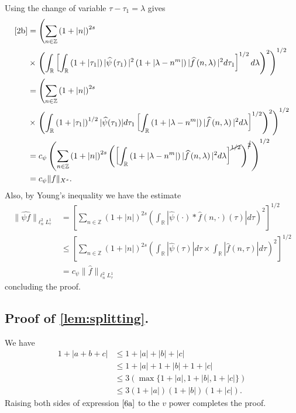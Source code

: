 \documentclass[12pt,reqno]{amsart}
\numberwithin{equation}{section}  %
\numberwithin{figure}{section}
\newcommand{\rr}{\mathbb{R}}
\newcommand{\zz}{\mathbb{Z}}
\newcommand{\wh}{\widehat}
\theoremstyle{plain}
\theoremstyle{definition}
\theoremstyle{remark}
\begin{document}
%
%
Using the change of variable $\tau - \tau_1 = \lambda$ gives
%
%
\begin{equation*}
	\begin{split}
		\eqref{2b}
		& = \left( \sum_{n \in \zz} \left (1 + |n| \right )^{2s}\right.
		\\
		& \times \left.  \left( \int_\rr \left[
		\int_\rr \left( 1 + | \tau_1 | \right) | \wh{\psi}\left( \tau_1
		\right) |^2 \left( 1 + | \lambda - n^{m} | \right) | \wh{f} \left( n,
		\lambda
		\right)|^2 d \tau_1 \right]^{1/2} d \lambda \right)^2 \right)^{1/2}
		\\
		& =  \left( \sum_{n \in \zz} \left (1 + |n| \right )^{2s} \right.
		\\
		& \times \left. \left( \int_\rr \left( 1 + |
		\tau_1 |
		\right)^{1/2} | \wh{\psi}(\tau_1) | d \tau_1 \left[ \int_\rr \left( 1 + |
		\lambda - n^{m} |
		\right) | \wh{f}\left( n, \lambda \right) |^2 d \lambda \right]^{1/2}
		\right)^2 \right)^{1/2}
		\\
		& = c_{\psi} \left( \sum_{n \in \zz} \left (1 + |n| \right )^{2s} \left( \left[ \int_\rr
		\left( 1 + | \lambda - n^{m} | \right) | \wh{f}\left( n, \lambda
		\right) |^2 d \lambda
		\right]^{\cancel{1/2}} \right)^{\cancel{2}} \right)^{1/2}
		\\
		& = c_{\psi} \|f\|_{X^s}.
	\end{split}
\end{equation*}
%
Also, by Young's inequality we have the estimate 
%
%
\begin{equation*}
\begin{split}
  \|\wh{\psi f}\|_{\ell^{2}_{n} L^{1}_{\tau}} 
  & = \left[ \sum_{n \in \zz} \left (1 + |n| \right )^{2s} \left (
  \int_{\rr} | \wh{\psi}(\cdot) * \wh{f}(n, \cdot)(\tau) | d \tau  \right ) ^2 \right]^{1/2}
  \\
  & \le  \left[ \sum_{n \in \zz} (1 + | n |)^{2s} \left( \int_{\rr} |
    \wh{\psi}(\tau) | d \tau  \times \int_{\rr} | \wh{f}(n, \tau) | d \tau
    \right)^{2}\right]^{1/2}
  \\
  & = c_{\psi} \| \wh{f} \|_{\ell^{2}_{n} L^{1}_{\tau}}
\end{split}
\end{equation*}
%
%
%
concluding the proof. \qquad \qedsymbol
\subsection{Proof of \autoref{lem:splitting}.} We have
%
%
\begin{equation}
	\label{6a}
	\begin{split}
		1 + | a + b + c| 
		& \le 1 + | a | + | b | + | c |
		\\
		& \le 1 + | a | + 1 + | b | + 1 + | c |
		\\
		& \le 3\left( \max\{1+| a |, 1+| b |, 1+ | c | \}\right)
		\\
		& \le 3 \left( 1 + | a | \right)\left( 1 + | b | \right) \left( 1 + |
		c |
		\right).
	\end{split}
\end{equation}
%
%
Raising both sides of expression $\eqref{6a}$ to the $v$ power completes 
the proof. \qquad \qedsymbol 
%
%
%
\end{document}

